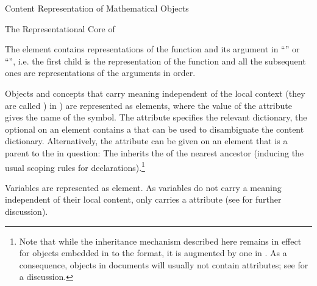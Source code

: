 \begin{omgroup}[id=mobj.core]{Content Representation of Mathematical Objects}
\begin{module}[id=OpenMath]
\begin{omgroup}[id=openmath]{The Representational Core of \openmath}
\begin{definition}
  The  element contains representations of the function and its
  argument in ``'' or ``{}'',
  i.e. the first child is the representation of the function and all the subsequent ones
  are representations of the arguments in order.
\end{definition}

\begin{definition}
  Objects and concepts that carry meaning independent of the local context (they are
  called ) in {\openmath}) are represented as 
  elements, where the value of the  attribute gives the
  name of the symbol.  The  attribute specifies the relevant
   {dictionary}, the optional  on an
   element contains a {} that can be used to
  disambiguate the content dictionary.  Alternatively, the {}
  attribute can be given on an {\openmath} element that is a parent to the
   in question: The  inherits the
  {} of the nearest ancestor (inducing the usual {\xml} scoping
  rules for declarations).\footnote{Note that while the {}
    inheritance mechanism described here remains in effect for {\openmath} objects
    embedded in to the \omdoc format, it is augmented by one in \omdoc. As a consequence,
    {\openmath} objects in \omdoc documents will usually not contain
    {} attributes; see  for a discussion.}
\end{definition}

\begin{definition}
  Variables are represented as  element.  As variables do not carry
  a meaning independent of their local content,  only carries a
   attribute (see  for further
  discussion).
\end{definition}


\end{omgroup}
\end{module}
\end{omgroup}
